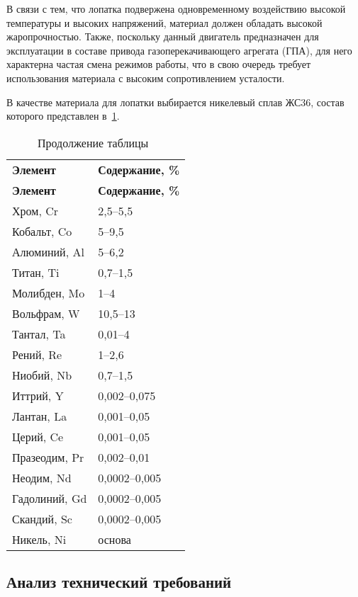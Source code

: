 В связи с тем, что лопатка подвержена одновременному воздействию высокой температуры и высоких напряжений, материал должен обладать высокой жаропрочностью. Также, поскольку данный двигатель предназначен для эксплуатации в составе привода газоперекачивающего агрегата (ГПА), для него характерна частая смена режимов работы, что в свою очередь требует использования материала с высоким сопротивлением усталости.

В качестве материала для лопатки выбирается никелевый сплав ЖС36, состав которого представлен в~\ref{tab:technology-alloy-properties}.

\begin{longtable}{|l|l|}
	\caption{Состав сплава ЖС36} \label{tab:technology-alloy-properties}
	\endfirsthead
	\caption*{\tabcapalign Продолжение таблицы~\thetable}\\[-0.45\onelineskip]
	\hline
	\textbf{Элемент} & \textbf{Содержание, \%} \\ \hline
	\endhead
	\hline
	\textbf{Элемент} & \textbf{Содержание, \%} \\ \hline
	Хром, Cr & 2,5–5,5 \\ \hline
	Кобальт, Co & 5–9,5 \\ \hline
	Алюминий, Al & 5–6,2 \\ \hline
	Титан, Ti & 0,7–1,5 \\ \hline
	Молибден, Mo & 1–4 \\ \hline
	Вольфрам, W & 10,5–13 \\ \hline
	Тантал, Ta & 0,01–4 \\ \hline
	Рений, Re & 1–2,6 \\ \hline
	Ниобий, Nb & 0,7–1,5 \\ \hline
	Иттрий, Y & 0,002–0,075 \\ \hline
	Лантан, La & 0,001–0,05 \\ \hline
	Церий, Ce & 0,001–0,05 \\ \hline
	Празеодим, Pr & 0,002–0,01 \\ \hline
	Неодим, Nd & 0,0002–0,005 \\ \hline
	Гадолиний, Gd & 0,0002–0,005 \\ \hline
	Скандий, Sc & 0,0002–0,005 \\ \hline
	Никель, Ni & основа \\ \hline
\end{longtable}

\subsection{Анализ технический требований}

